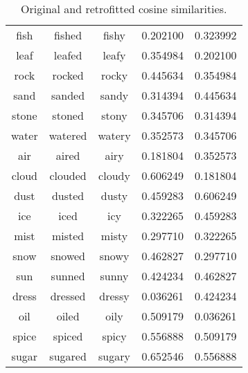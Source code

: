 \documentclass[12pt]{article}
\begin{document}
\begin{table}[p]
\begin{center}
\begin{tabular}{||c c c c c||}
            fish & fished & fishy & 0.202100 & 0.323992 \\
            leaf & leafed & leafy & 0.354984 & 0.202100 \\
            rock & rocked & rocky & 0.445634 & 0.354984 \\
            sand & sanded & sandy & 0.314394 & 0.445634 \\
            stone & stoned & stony & 0.345706 & 0.314394 \\
            water & watered & watery & 0.352573 & 0.345706 \\
            air & aired & airy & 0.181804 & 0.352573 \\
            cloud & clouded & cloudy & 0.606249 & 0.181804 \\
            dust & dusted & dusty & 0.459283 & 0.606249 \\
            ice & iced & icy & 0.322265 & 0.459283 \\
            mist & misted & misty & 0.297710 & 0.322265 \\
            snow & snowed & snowy & 0.462827 & 0.297710 \\
            sun & sunned & sunny & 0.424234 & 0.462827 \\
            dress & dressed & dressy & 0.036261 & 0.424234 \\
            oil & oiled & oily & 0.509179 & 0.036261 \\
            spice & spiced & spicy & 0.556888 & 0.509179 \\
            sugar & sugared & sugary & 0.652546 & 0.556888 \\
            \hline    
                
            \end{tabular}
        \end{center}
        \caption{Original and retrofitted cosine similarities.}
        \end{table}
\end{document}
